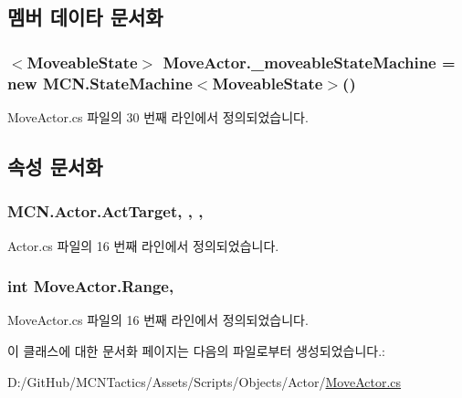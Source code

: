 \subsection{멤버 데이타 문서화}
\subsubsection[{\texorpdfstring{\+\_\+moveable\+State\+Machine}{_moveableStateMachine}}]{$<${\bf Moveable\+State}$>$ Move\+Actor.\+\_\+moveable\+State\+Machine = new {\bf M\+C\+N.\+State\+Machine}$<${\bf Moveable\+State}$>$()\hspace{0.3cm}{\ttfamily [private]}}\hypertarget{class_move_actor_a72afe80e236dbb9a66b27f752e8231f1}{}\label{class_move_actor_a72afe80e236dbb9a66b27f752e8231f1}


Move\+Actor.\+cs 파일의 30 번째 라인에서 정의되었습니다.



\subsection{속성 문서화}
\subsubsection[{\texorpdfstring{Act\+Target}{ActTarget}}]{ M\+C\+N.\+Actor.\+Act\+Target\hspace{0.3cm}{\ttfamily [get]}, {}, {\ttfamily [protected]}, {\ttfamily [inherited]}}\hypertarget{class_m_c_n_1_1_actor_a4e2e573370bb52bb747f77d4c75dc7e1}{}\label{class_m_c_n_1_1_actor_a4e2e573370bb52bb747f77d4c75dc7e1}


Actor.\+cs 파일의 16 번째 라인에서 정의되었습니다.

\subsubsection[{\texorpdfstring{Range}{Range}}]{\setlength{\rightskip}{0pt plus 5cm}int Move\+Actor.\+Range\hspace{0.3cm}{\ttfamily [get]}, {\ttfamily [private]}}\hypertarget{class_move_actor_a4473f7867a074c8ca605220086c5d8fd}{}\label{class_move_actor_a4473f7867a074c8ca605220086c5d8fd}


Move\+Actor.\+cs 파일의 16 번째 라인에서 정의되었습니다.



이 클래스에 대한 문서화 페이지는 다음의 파일로부터 생성되었습니다.\+:\begin{DoxyCompactItemize}
\item 
D\+:/\+Git\+Hub/\+M\+C\+N\+Tactics/\+Assets/\+Scripts/\+Objects/\+Actor/\hyperlink{_move_actor_8cs}{Move\+Actor.\+cs}\end{DoxyCompactItemize}

